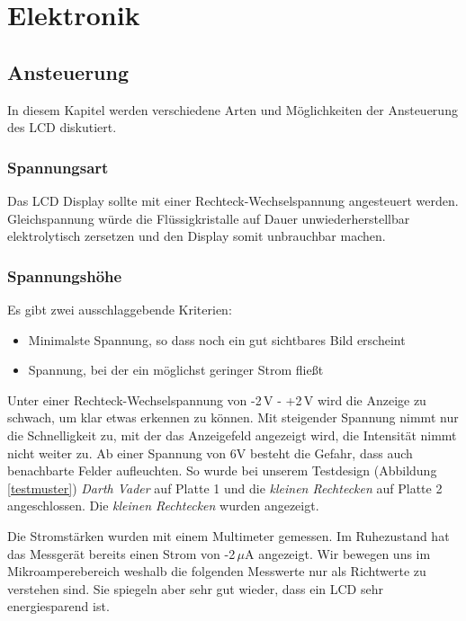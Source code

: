 \section{Elektronik}\label{sec:elektronik}
\subsection{Ansteuerung}
In diesem Kapitel werden verschiedene Arten und Möglichkeiten der Ansteuerung des LCD diskutiert.

\subsubsection{Spannungsart}
Das LCD Display sollte mit einer Rechteck-Wechselspannung angesteuert werden. Gleichspannung würde die Flüssigkristalle auf Dauer unwiederherstellbar elektrolytisch zersetzen und den Display somit unbrauchbar machen.

\subsubsection{Spannungshöhe}\label{subsec:spannung}
Es gibt zwei ausschlaggebende Kriterien:
\begin{itemize}
\item Minimalste Spannung, so dass noch ein gut sichtbares Bild erscheint
\item Spannung, bei der ein möglichst geringer Strom fließt\\
\end{itemize}

Unter einer Rechteck-Wechselspannung von -2\,V - +2\,V wird die Anzeige zu schwach, um klar etwas erkennen zu können. Mit steigender Spannung nimmt nur die Schnelligkeit zu, mit der das Anzeigefeld angezeigt wird, die Intensität nimmt nicht weiter zu. Ab einer Spannung von 6V besteht die Gefahr, dass auch benachbarte Felder aufleuchten. So wurde bei unserem Testdesign (Abbildung \ref{testmuster}) \textit{Darth Vader} auf Platte 1 und die \textit{kleinen Rechtecken} auf Platte 2 angeschlossen. Die \textit{kleinen Rechtecken} wurden angezeigt.

Die Stromstärken wurden mit einem Multimeter gemessen. Im Ruhezustand hat das Messgerät bereits einen Strom von -2\,$\mu$A 
 angezeigt. Wir bewegen uns im Mikroamperebereich weshalb die folgenden Messwerte nur als Richtwerte zu verstehen sind. Sie spiegeln aber sehr gut wieder, dass ein LCD sehr energiesparend ist.

